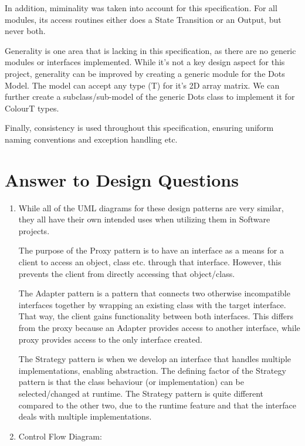 \documentclass[12pt]{article}
\begin{document}
In addition, miminality was taken into account for this specification. For all modules, its access routines either does a State Transition or an Output, but never both. 

Generality is one area that is lacking in this specification, as there are no generic modules or interfaces implemented. While it's not a key design aspect for this project, generality can be improved by creating a generic module for the Dots Model. The model can accept any type (T) for it's 2D array matrix. We can further create a subclass/sub-model of the generic Dots class to implement it for ColourT types. 

Finally, consistency is used throughout this specification, ensuring uniform naming conventions and exception handling etc. 


\section*{Answer to Design Questions}

\begin{enumerate}
\item While all of the UML diagrams for these design patterns are very similar, they all have their own intended uses when utilizing them in Software projects. 

The purpose of the Proxy pattern is to have an interface as a means for a client to access an object, class etc. through that interface. However, this prevents the client from directly accessing that object/class.

The Adapter pattern is a pattern that connects two otherwise incompatible interfaces together by wrapping an existing class with the target interface. That way, the client gains functionality between both interfaces. This differs from the proxy because an Adapter provides access to another interface, while proxy provides access to the only interface created. 

The Strategy pattern is when we develop an interface that handles multiple implementations, enabling abstraction. The defining factor of the Strategy pattern is that the class behaviour (or implementation) can be selected/changed at runtime. The Strategy pattern is quite different compared to the other two, due to the runtime feature and that the interface deals with multiple implementations. 

\item Control Flow Diagram:
 
\end{enumerate}
\end{document}
